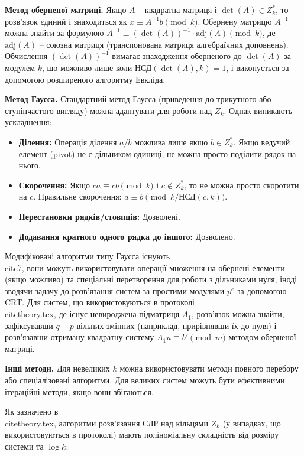 \documentclass[a4paper,12pt]{article}
\begin{document}
    \textbf{Метод оберненої матриці.} Якщо \(A\) -- квадратна матриця і \(\det(A) \in Z_k^*\), то розв'язок єдиний і знаходиться як \(x \equiv A^{-1}b \pmod k\). Обернену матрицю \(A^{-1}\) можна знайти за формулою \(A^{-1} \equiv (\det(A))^{-1} \cdot \text{adj}(A) \pmod k\), де \(\text{adj}(A)\) -- союзна матриця (транспонована матриця алгебраїчних доповнень). Обчислення \({(\det(A))^{-1}}\) вимагає знаходження оберненого до \(\det(A)\) за модулем \(k\), що можливо лише коли НСД\((\det(A), k)=1\), і виконується за допомогою розширеного алгоритму Евкліда.

    \textbf{Метод Гаусса.} Стандартний метод Гаусса (приведення до трикутного або ступінчастого вигляду) можна адаптувати для роботи над \(Z_k\). Однак виникають ускладнення:
    \begin{itemize}
        \item \textbf{Ділення:} Операція ділення \(a/b\) можлива лише якщо \(b \in Z_k^*\). Якщо ведучий елемент (pivot) не є дільником одиниці, не можна просто поділити рядок на нього.
        \item \textbf{Скорочення:} Якщо \(ca \equiv cb \pmod k\) і \(c \notin Z_k^*\), то не можна просто скоротити на \(c\). Правильне скорочення: \(a \equiv b \pmod{k/\text{НСД}(c,k)}\).
        \item \textbf{Перестановки рядків/стовпців:} Дозволені.
        \item \textbf{Додавання кратного одного рядка до іншого:} Дозволено.
    \end{itemize}
    Модифіковані алгоритми типу Гаусса існують \\cite{7}, вони можуть використовувати операції множення на обернені елементи (якщо можливо) та спеціальні перетворення для роботи з дільниками нуля, іноді зводячи задачу до розв'язання систем за простими модулями \(p^e\) за допомогою CRT. Для систем, що використовуються в протоколі \\cite{theory.tex}, де існує невироджена підматриця \(A_1\), розв'язок можна знайти, зафіксувавши \(q-p\) вільних змінних (наприклад, прирівнявши їх до нуля) і розв'язавши отриману квадратну систему \(A_1 u \equiv b' \pmod m\) методом оберненої матриці.

    \textbf{Інші методи.} Для невеликих \(k\) можна використовувати методи повного перебору або спеціалізовані алгоритми. Для великих систем можуть бути ефективними ітераційні методи, якщо вони збігаються.

    Як зазначено в \\cite{theory.tex}, алгоритми розв'язання СЛР над кільцями \(Z_k\) (у випадках, що використовуються в протоколі) мають поліноміальну складність від розміру системи та \(\log k\).
\end{document}
